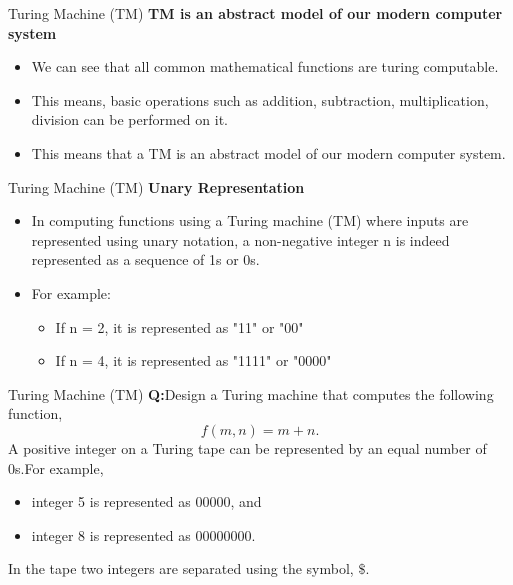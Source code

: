 \documentclass{beamer}
\begin{document}
\begin{frame}{Turing Machine (TM)}
	\textbf{TM is an abstract model of our modern computer system}
	\begin{itemize}
		\item 	We can see that all common mathematical functions are turing computable.
		\item This means, basic operations such as addition, subtraction, multiplication, division can be performed on it.
		\item This means that a TM is an abstract model of our modern computer system.
	\end{itemize}

\end{frame}		
\begin{frame}{Turing Machine (TM)}
	\textbf{Unary Representation}
	\begin{itemize}
		\item In computing functions using a Turing machine (TM) where inputs are represented using unary notation, a non-negative integer n is indeed represented as a sequence of 1s or 0s.
		\item For example:
		\begin{itemize}
			\item If n = 2, it is represented as "11" or "00"
		\item	If n = 4, it is represented as "1111" or "0000"
		\end{itemize}
	\end{itemize}
\end{frame}	
\begin{frame}{Turing Machine (TM)}
	\textbf{Q:}Design a Turing machine that computes the following function, $$f(m, n) = m + n.$$
		A positive integer on a Turing tape can be represented by an equal number of 0s.For example,
		\begin{itemize}
			\item integer 5 is represented as 00000, and
		\item integer 8 is represented as 00000000.
		\end{itemize}
	In the tape two integers are separated using the symbol, $\$ $.\\

	
\end{frame}	
\end{document}
